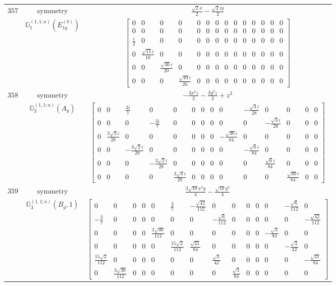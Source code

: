 \documentclass[fleqn,8pt,landscape]{jsarticle}
\begin{document}
\begin{longtable}{ccc}
$ 357 $ & $ \text{symmetry} $ & $ \frac{\sqrt{2} x}{2} - \frac{\sqrt{2} i y}{2} $ \\
$  $ & $ \mathbb{G}_{1}^{(1,1;a)}(E_{1g}^{(b)}) $ & $ \begin{bmatrix} 0 & 0 & 0 & 0 & 0 & 0 & 0 & 0 & 0 & 0 & 0 & 0 & 0 & 0 \\ 0 & 0 & 0 & 0 & 0 & 0 & 0 & 0 & 0 & 0 & 0 & 0 & 0 & 0 \\ \frac{i}{2} & 0 & 0 & 0 & 0 & 0 & 0 & 0 & 0 & 0 & 0 & 0 & 0 & 0 \\ 0 & \frac{\sqrt{15} i}{10} & 0 & 0 & 0 & 0 & 0 & 0 & 0 & 0 & 0 & 0 & 0 & 0 \\ 0 & 0 & \frac{\sqrt{30} i}{20} & 0 & 0 & 0 & 0 & 0 & 0 & 0 & 0 & 0 & 0 & 0 \\ 0 & 0 & 0 & \frac{\sqrt{10} i}{20} & 0 & 0 & 0 & 0 & 0 & 0 & 0 & 0 & 0 & 0 \end{bmatrix} $ \\ \hline
$ 358 $ & $ \text{symmetry} $ & $ - \frac{3 x^{2} z}{2} - \frac{3 y^{2} z}{2} + z^{3} $ \\
$  $ & $ \mathbb{G}_{3}^{(1,1;a)}(A_{g}) $ & $ \begin{bmatrix} 0 & 0 & \frac{3 i}{7} & 0 & 0 & 0 & 0 & 0 & 0 & - \frac{\sqrt{3} i}{28} & 0 & 0 & 0 & 0 \\ 0 & 0 & 0 & - \frac{3 i}{7} & 0 & 0 & 0 & 0 & 0 & 0 & - \frac{\sqrt{3} i}{28} & 0 & 0 & 0 \\ 0 & \frac{3 \sqrt{3} i}{28} & 0 & 0 & 0 & 0 & 0 & 0 & - \frac{\sqrt{30} i}{84} & 0 & 0 & 0 & 0 & 0 \\ 0 & 0 & - \frac{3 \sqrt{2} i}{28} & 0 & 0 & 0 & 0 & 0 & 0 & - \frac{\sqrt{6} i}{84} & 0 & 0 & 0 & 0 \\ 0 & 0 & 0 & - \frac{3 \sqrt{2} i}{28} & 0 & 0 & 0 & 0 & 0 & 0 & \frac{\sqrt{6} i}{84} & 0 & 0 & 0 \\ 0 & 0 & 0 & 0 & \frac{3 \sqrt{3} i}{28} & 0 & 0 & 0 & 0 & 0 & 0 & \frac{\sqrt{30} i}{84} & 0 & 0 \end{bmatrix} $ \\ \hline
$ 359 $ & $ \text{symmetry} $ & $ \frac{3 \sqrt{10} x^{2} y}{4} - \frac{\sqrt{10} y^{3}}{4} $ \\
$  $ & $ \mathbb{G}_{3}^{(1,1;a)}(B_{g},1) $ & $ \begin{bmatrix} 0 & 0 & 0 & 0 & 0 & \frac{3}{7} & - \frac{\sqrt{42}}{112} & 0 & 0 & 0 & 0 & 0 & - \frac{\sqrt{6}}{112} & 0 \\ - \frac{3}{7} & 0 & 0 & 0 & 0 & 0 & 0 & - \frac{\sqrt{6}}{112} & 0 & 0 & 0 & 0 & 0 & - \frac{\sqrt{42}}{112} \\ 0 & 0 & 0 & 0 & \frac{3 \sqrt{30}}{112} & 0 & 0 & 0 & 0 & 0 & 0 & - \frac{\sqrt{3}}{84} & 0 & 0 \\ 0 & 0 & 0 & 0 & 0 & \frac{15 \sqrt{2}}{112} & \frac{\sqrt{21}}{84} & 0 & 0 & 0 & 0 & 0 & - \frac{\sqrt{3}}{42} & 0 \\ \frac{15 \sqrt{2}}{112} & 0 & 0 & 0 & 0 & 0 & 0 & \frac{\sqrt{3}}{42} & 0 & 0 & 0 & 0 & 0 & - \frac{\sqrt{21}}{84} \\ 0 & \frac{3 \sqrt{30}}{112} & 0 & 0 & 0 & 0 & 0 & 0 & \frac{\sqrt{3}}{84} & 0 & 0 & 0 & 0 & 0 \end{bmatrix} $ \\ \hline

\end{longtable}
\end{document}
